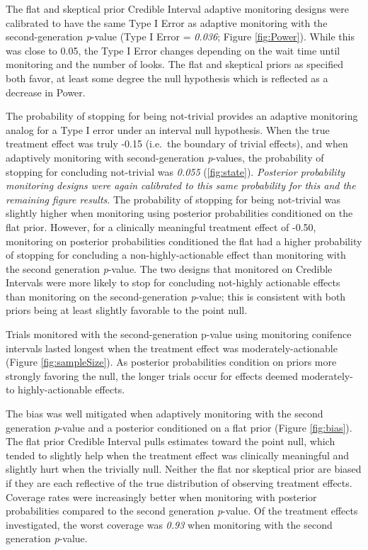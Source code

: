 \documentclass[12pt,oneside]{book}
\newlength{\li}\setlength{\li}{14.48pt}
\newlength{\di}\setlength{\di}{-3.5mm}
\theoremstyle{definition}
\theoremstyle{definition}
\theoremstyle{definition}
\theoremstyle{remark}
\begin{document}
The flat and skeptical prior Credible Interval adaptive monitoring
designs were calibrated to have the same Type I Error as adaptive
monitoring with the second-generation \emph{p}-value (Type I Error =
\emph{0.036}; Figure \ref{fig:Power}). While this was close to 0.05, the
Type I Error changes depending on the wait time until monitoring and the
number of looks. The flat and skeptical priors as specified both favor,
at least some degree the null hypothesis which is reflected as a
decrease in Power.

The probability of stopping for being not-trivial provides an adaptive
monitoring analog for a Type I error under an interval null hypothesis.
When the true treatment effect was truly -0.15 (i.e.~the boundary of
trivial effects), and when adaptively monitoring with second-generation
\emph{p}-values, the probability of stopping for concluding not-trivial
was \emph{0.055} (\ref{fig:state}). \emph{Posterior probability
monitoring designs were again calibrated to this same probability for
this and the remaining figure results}. The probability of stopping for
being not-trivial was slightly higher when monitoring using posterior
probabilities conditioned on the flat prior. However, for a clinically
meaningful treatment effect of -0.50, monitoring on posterior
probabilities conditioned the flat had a higher probability of stopping
for concluding a non-highly-actionable effect than monitoring with the
second generation \emph{p}-value. The two designs that monitored on
Credible Intervals were more likely to stop for concluding not-highly
actionable effects than monitoring on the second-generation
\emph{p}-value; this is consistent with both priors being at least
slightly favorable to the point null.

Trials monitored with the second-generation p-value using monitoring
conifence intervals lasted longest when the treatment effect was
moderately-actionable (Figure \ref{fig:sampleSize}). As posterior
probabilities condition on priors more strongly favoring the null, the
longer trials occur for effects deemed moderately- to highly-actionable
effects.

The bias was well mitigated when adaptively monitoring with the second
generation \emph{p}-value and a posterior conditioned on a flat prior
(Figure \ref{fig:bias}). The flat prior Credible Interval pulls
estimates toward the point null, which tended to slightly help when the
treatment effect was clinically meaningful and slightly hurt when the
trivially null. Neither the flat nor skeptical prior are biased if they
are each reflective of the true distribution of observing treatment
effects. Coverage rates were increasingly better when monitoring with
posterior probabilities compared to the second generation
\emph{p}-value. Of the treatment effects investigated, the worst
coverage was \emph{0.93} when monitoring with the second generation
\emph{p}-value.
\end{document}
